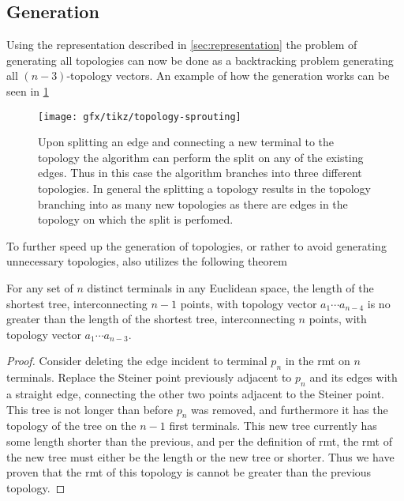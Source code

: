 \subsection{Generation}
\label{sec:generation}

Using the representation described in \cref{sec:representation} the problem of
generating all topologies can now be done as a backtracking problem generating
all $(n-3)$-topology vectors. An example of how the generation works can be seen
in \cref{fig:topology-sprouting}

\begin{figure}[htbp]
  \centering
  \texttt{[image: gfx/tikz/topology-sprouting]}
  \caption[Splitting of an edge]{Upon splitting an edge and connecting a new
    terminal to the topology the algorithm can perform the split on any of the
    existing edges. Thus in this case the algorithm branches into three
    different topologies. In general the splitting a topology results in the topology
    branching into as many new topologies as there are edges in the topology on which
    the split is perfomed.\label{fig:topology-sprouting}}
\end{figure}

To further speed up the generation of topologies, or rather to avoid generating
unnecessary topologies, \citeauthor{smith1992} also utilizes the following theorem
%
\begin{theorem}
  For any set of $n$ distinct terminals in any Euclidean space, the length of
  the shortest tree, interconnecting $n-1$ points, with topology vector
  $a_1 \cdots a_{n-4}$ is no greater than the length of the shortest tree,
  interconnecting $n$ points, with topology vector $a_1 \cdots a_{n-3}$.
\end{theorem}
%
\begin{proof}
  Consider deleting the edge incident to terminal $p_n$ in the \ac{rmt} on $n$
  terminals. Replace the Steiner point previously adjacent to $p_n$ and its
  edges with a straight edge, connecting the other two points adjacent to the
  Steiner point. This tree is not longer than before $p_n$ was removed, and
  furthermore it has the topology of the tree on the $n-1$ first terminals. This
  new tree currently has some length shorter than the previous, and per the
  definition of \ac{rmt}, the \ac{rmt} of the new tree must either be the length
  or the new tree or shorter. Thus we have proven that the \ac{rmt} of this
  topology is cannot be greater than the previous topology.
\end{proof}

